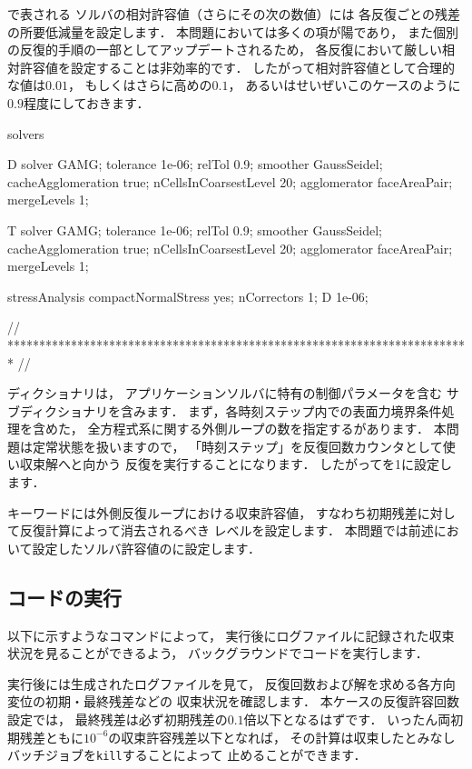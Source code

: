 %
%
で表される
ソルバの相対許容値（さらにその次の数値）には
各反復ごとの残差の所要低減量を設定します．
本問題においては多くの項が陽であり，
また個別の反復的手順の一部としてアップデートされるため，
各反復において厳しい相対許容値を設定することは非効率的です．
したがって相対許容値として合理的な値は$0.01$，
もしくはさらに高めの$0.1$，
あるいはせいぜいこのケースのように$0.9$程度にしておきます．
\begin{OFverbatim}[file, linenum=17]

solvers
{
    D
    {
        solver          GAMG;
        tolerance       1e-06;
        relTol          0.9;
        smoother        GaussSeidel;
        cacheAgglomeration true;
        nCellsInCoarsestLevel 20;
        agglomerator    faceAreaPair;
        mergeLevels     1;
    }

    T
    {
        solver          GAMG;
        tolerance       1e-06;
        relTol          0.9;
        smoother        GaussSeidel;
        cacheAgglomeration true;
        nCellsInCoarsestLevel 20;
        agglomerator    faceAreaPair;
        mergeLevels     1;
    }
}

stressAnalysis
{
    compactNormalStress yes;
    nCorrectors     1;
    D               1e-06;
}


// ************************************************************************* //
\end{OFverbatim}
ディクショナリは，
アプリケーションソルバに特有の制御パラメータを含む
サブディクショナリを含みます．
まず，各時刻ステップ内での表面力境界条件処理を含めた，
全方程式系に関する外側ループの数を指定するがあります．
本問題は定常状態を扱いますので，
「時刻ステップ」を反復回数カウンタとして使い収束解へと向かう
反復を実行することになります．
したがってを1に設定します．

キーワードには外側反復ループにおける収束許容値，
すなわち初期残差に対して反復計算によって消去されるべき
レベルを設定します．
本問題では前述において設定したソルバ許容値のに設定します．


\subsection{コードの実行}
\label{ssec:2.2.2}
以下に示すようなコマンドによって，
実行後にログファイルに記録された収束状況を見ることができるよう，
バックグラウンドでコードを実行します．
実行後には生成されたログファイルを見て，
反復回数および解を求める各方向変位の初期・最終残差などの
収束状況を確認します．
本ケースの反復許容回数設定では，
最終残差は必ず初期残差の$0.1$倍以下となるはずです．
いったん両初期残差ともに$10^{-6}$の収束許容残差以下となれば，
その計算は収束したとみなしバッチジョブを\texttt{kill}することによって
止めることができます．


